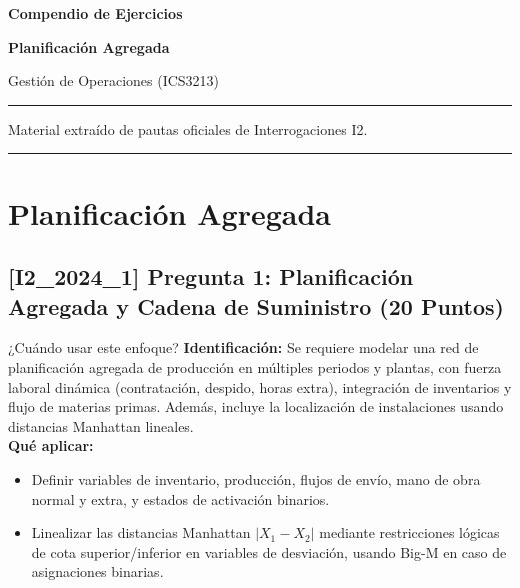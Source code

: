 \documentclass[11pt, a4paper]{article}
\begin{document}
\begin{titlepage}
  \centering
  \vspace*{2cm}
  {\Huge\bfseries\color{gopcyan} Compendio de Ejercicios\par}
  \vspace{0.4cm}
  {\LARGE\bfseries Planificación Agregada\par}
  \vspace{0.3cm}
  {\large Gestión de Operaciones (ICS3213)\par}
  \vspace{1.2cm}
  \rule{\textwidth}{0.4pt}
  \vspace{0.4cm}
  {\small Material extraído de pautas oficiales de Interrogaciones I2.\par}
  \vspace{0.4cm}
  \rule{\textwidth}{0.4pt}
  \vfill
\end{titlepage}

\newpage
\section*{Planificación Agregada}

\subsection*{[I2_2024_1] Pregunta 1: Planificación Agregada y Cadena de Suministro (20 Puntos)}
\begin{tipprueba}{¿Cuándo usar este enfoque?}
    \textbf{Identificación:} Se requiere modelar una red de planificación agregada de producción en múltiples periodos y plantas, con fuerza laboral dinámica (contratación, despido, horas extra), integración de inventarios y flujo de materias primas. Además, incluye la localización de instalaciones usando distancias Manhattan lineales.\\
    \textbf{Qué aplicar:}
    \begin{itemize}
      \item Definir variables de inventario, producción, flujos de envío, mano de obra normal y extra, y estados de activación binarios.
      \item Linealizar las distancias Manhattan $|X_1 - X_2|$ mediante restricciones lógicas de cota superior/inferior en variables de desviación, usando Big-M en caso de asignaciones binarias.
    \end{itemize}
  \end{tipprueba}
\end{document}
